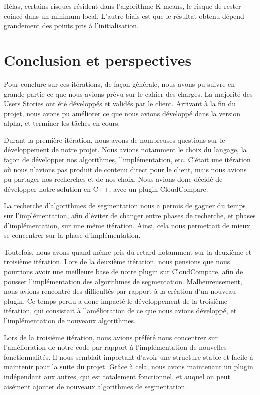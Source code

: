 \documentclass[12pt,titlepage,french]{article}
\begin{document}
Hélas, certains risques résident dans l'algorithme K-means, le risque de rester coincé dans un minimum local. L'autre biais est que le résultat obtenu dépend grandement des points pris à l'initialisation.

\section{Conclusion et perspectives}

Pour conclure sur ces itérations, de façon générale, nous avons pu suivre en grande partie ce que nous avions prévu sur le cahier des charges. La majorité des Users Stories ont été développés et validés par le client. Arrivant à la fin du projet, nous avons pu améliorer ce que nous avions développé dans la version alpha, et terminer les tâches en cours.\newline

Durant la première itération, nous avons de nombreuses questions sur le développement de notre projet. Nous avions notamment le choix du langage, la façon de développer nos algorithmes, l'implémentation, etc. C'était une itération où nous n'avions pas produit de contenu direct pour le client, mais nous avions pu partager nos recherches et de nos choix. Nous avions donc décidé de développer notre solution en C++, avec un plugin CloudCompare. \newline

La recherche d'algorithmes de segmentation nous a permis de gagner du temps sur l'implémentation, afin d'éviter de changer entre phases de recherche, et phases d'implémentation, sur une même itération. Ainsi, cela nous permettait de mieux se concentrer sur la phase d'implémentation. \newline

Toutefois, nous avons quand même pris du retard notamment sur la deuxième et troisième itération. Lors de la deuxième itération, nous pensions que nous pourrions avoir une meilleure base de notre plugin sur CloudCompare, afin de pousser l'implémentation des algorithmes de segmentation. Malheureusement, nous avions rencontré des difficultés par rapport à la création d'un nouveau plugin. Ce temps perdu a donc impacté le développement de la troisième itération, qui consistait à l'amélioration de ce que nous avions développé, et l'implémentation de nouveaux algorithmes. \newline

Lors de la troisième itération, nous avions préféré nous concentrer sur l'amélioration de notre code par rapport à l'implémentation de nouvelles fonctionnalités. Il nous semblait important d'avoir une structure stable et facile à maintenir pour la suite du projet. Grâce à cela, nous avons maintenant un plugin indépendant aux autres, qui est totalement fonctionnel, et auquel on peut aisément ajouter de nouveaux algorithmes de segmentation. \newline
\end{document}
